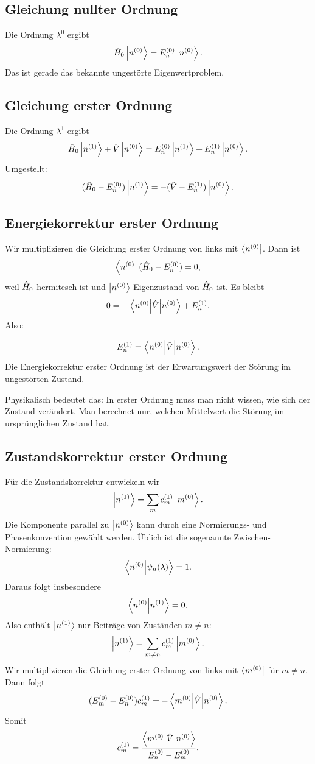 \subsection{Gleichung nullter Ordnung}

Die Ordnung \(\lambda^0\) ergibt
\[
    \hat H_0\left|n^{(0)}\right\rangle=E_n^{(0)}\left|n^{(0)}\right\rangle.
\]
Das ist gerade das bekannte ungestörte Eigenwertproblem.

\subsection{Gleichung erster Ordnung}

Die Ordnung \(\lambda^1\) ergibt
\[
    \hat H_0\left|n^{(1)}\right\rangle+\hat V\left|n^{(0)}\right\rangle
    =E_n^{(0)}\left|n^{(1)}\right\rangle+E_n^{(1)}\left|n^{(0)}\right\rangle.
\]
Umgestellt:
\[
    (\hat H_0-E_n^{(0)})\left|n^{(1)}\right\rangle
    =-(\hat V-E_n^{(1)})\left|n^{(0)}\right\rangle.
\]

\subsection{Energiekorrektur erster Ordnung}

Wir multiplizieren die Gleichung erster Ordnung von links mit \(\left\langle n^{(0)}\right|\). Dann ist
\[
    \left\langle n^{(0)}\right|(\hat H_0-E_n^{(0)})=0,
\]
weil \(\hat H_0\) hermitesch ist und \(\left|n^{(0)}\right\rangle\) Eigenzustand von \(\hat H_0\) ist. Es bleibt
\[
    0=-\left\langle n^{(0)}\middle|\hat V\middle|n^{(0)}\right\rangle+E_n^{(1)}.
\]
Also:
\begin{formulabox}
\[
    E_n^{(1)}=\left\langle n^{(0)}\middle|\hat V\middle|n^{(0)}\right\rangle.
\]
Die Energiekorrektur erster Ordnung ist der Erwartungswert der Störung im ungestörten Zustand.
\end{formulabox}

\begin{notebox}
Physikalisch bedeutet das: In erster Ordnung muss man nicht wissen, wie sich der Zustand verändert. Man berechnet nur, welchen Mittelwert die Störung im ursprünglichen Zustand hat.
\end{notebox}

\subsection{Zustandskorrektur erster Ordnung}

Für die Zustandskorrektur entwickeln wir
\[
    \left|n^{(1)}\right\rangle=\sum_m c_m^{(1)}\left|m^{(0)}\right\rangle.
\]
Die Komponente parallel zu \(\left|n^{(0)}\right\rangle\) kann durch eine Normierungs- und Phasenkonvention gewählt werden. Üblich ist die sogenannte Zwischen-Normierung:
\[
    \left\langle n^{(0)}\middle|\psi_n(\lambda)\right\rangle=1.
\]
Daraus folgt insbesondere
\[
    \left\langle n^{(0)}\middle|n^{(1)}\right\rangle=0.
\]
Also enthält \(\left|n^{(1)}\right\rangle\) nur Beiträge von Zuständen \(m\neq n\):
\[
    \left|n^{(1)}\right\rangle=\sum_{m\neq n}c_m^{(1)}\left|m^{(0)}\right\rangle.
\]
Wir multiplizieren die Gleichung erster Ordnung von links mit \(\left\langle m^{(0)}\right|\) für \(m\neq n\). Dann folgt
\[
    (E_m^{(0)}-E_n^{(0)})c_m^{(1)}
    =-\left\langle m^{(0)}\middle|\hat V\middle|n^{(0)}\right\rangle.
\]
Somit
\[
    c_m^{(1)}=\frac{\left\langle m^{(0)}\middle|\hat V\middle|n^{(0)}\right\rangle}{E_n^{(0)}-E_m^{(0)}}.
\]


